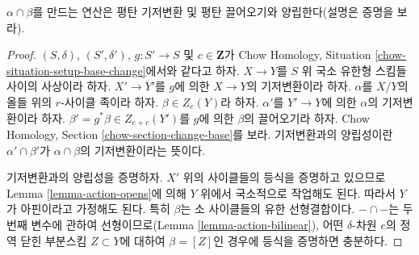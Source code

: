 \begin{lemma}
\label{lemma-action-base-change}
$\alpha \cap \beta$를 만드는 연산은 평탄 기저변환 및 평탄 끌어오기와
양립한다(설명은 증명을 보라).
\end{lemma}

\begin{proof}
$(S, \delta)$, $(S', \delta')$, $g : S' \to S$ 및
$c \in \mathbf{Z}$가 Chow Homology, Situation
\ref{chow-situation-setup-base-change}에서와 같다고 하자. $X \to Y$를
$S$ 위 국소 유한형 스킴들 사이의 사상이라 하자. $X' \to Y'$를
$g$에 의한 $X \to Y$의 기저변환이라 하자. $\alpha$를 $X/Y$의 올들
위의 $r$-사이클 족이라 하자. $\beta \in Z_e(Y)$라 하자. $\alpha'$를
$Y' \to Y$에 의한 $\alpha$의 기저변환이라 하자. $\beta' = g^*\beta
\in Z_{e + c}(Y')$를 $g$에 의한 $\beta$의 끌어오기라 하자. Chow
Homology, Section \ref{chow-section-change-base}를 보라. 기저변환과의
양립성이란 $\alpha' \cap \beta'$가 $\alpha \cap \beta$의
기저변환이라는 뜻이다.

\medskip\noindent
기저변환과의 양립성을 증명하자. $X'$ 위의 사이클들의 등식을
증명하고 있으므로 Lemma \ref{lemma-action-opens}에 의해 $Y$ 위에서
국소적으로 작업해도 된다. 따라서 $Y$가 아핀이라고 가정해도 된다.
특히 $\beta$는 소 사이클들의 유한 선형결합이다. $- \cap -$는 두 번째
변수에 관하여 선형이므로(Lemma \ref{lemma-action-bilinear}), 어떤
$\delta$-차원 $e$의 정역 닫힌 부분스킴 $Z \subset Y$에 대하여
$\beta = [Z]$인 경우에 등식을 증명하면 충분하다.


\end{proof}

